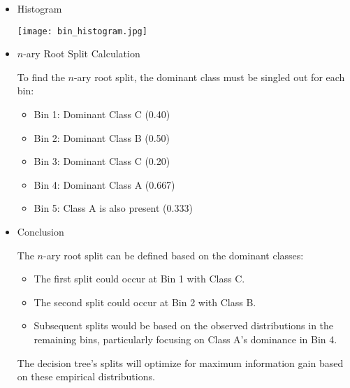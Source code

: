 \documentclass[12pt]{article}
\begin{document}
\begin{enumerate}[leftmargin=\labelsep, label=\textbf{\arabic*.)}]
\begin{itemize}
              \item Histogram

                    \begin{center}
                        \texttt{[image: bin\_histogram.jpg]}
                    \end{center}

              \item $n$-ary Root Split Calculation

                    To find the $n$-ary root split, the dominant class must be singled out for each bin:

                    \begin{itemize}
                        \item Bin 1: Dominant Class C (0.40)
                        \item Bin 2: Dominant Class B (0.50)
                        \item Bin 3: Dominant Class C (0.20)
                        \item Bin 4: Dominant Class A (0.667)
                        \item Bin 5: Class A is also present (0.333)
                    \end{itemize}

              \item Conclusion

                    The \( n \)-ary root split can be defined based on the dominant classes:

                    \begin{itemize}
                        \item The first split could occur at Bin 1 with Class C.
                        \item The second split could occur at Bin 2 with Class B.
                        \item Subsequent splits would be based on the observed distributions in the remaining bins, particularly focusing on Class A’s dominance in Bin 4.
                    \end{itemize}

                    The decision tree's splits will optimize for maximum information gain based on these empirical distributions.

          \end{itemize}
\end{enumerate}
\end{document}
